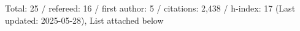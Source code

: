 Total: 25 / refereed: 16 / first author: 5 / citations: 2,438 / h-index: 17 (Last updated: 2025-05-28), List attached below